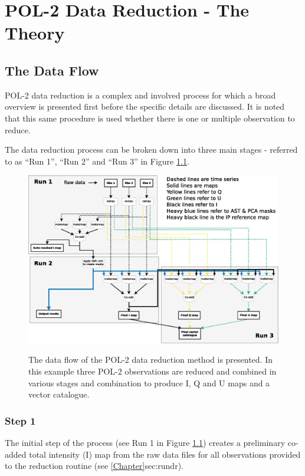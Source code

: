 \chapter{POL-2 Data Reduction - The Theory}
\label{sec:dr}
\section{The Data Flow}

POL-2 data reduction is a complex and involved process for which a broad overview is presented first before
the specific details are discussed. It is noted that this same procedure is used whether there is one or
multiple observation to reduce.

The data reduction process can be broken down into three main stages -
referred to as ``Run 1'', ``Run 2'' and ``Run 3'' in Figure \ref{fig:pol2drflow}.

\begin{figure}[t!]
\begin{center}
\includegraphics[width=0.95\linewidth]{pol2map_flow.eps}
\label{fig:pol2drflow}
\caption [POL-2 Data Flow]{
  \small The data flow of the POL-2 data reduction method is
  presented. In this example three POL-2 observations are
  reduced and combined in various stages and combination to
  produce I, Q and U maps and a vector catalogue.
}
\end{center}
\end{figure}


\subsection*{Step 1}

The initial step of the process (see Run 1 in Figure \ref{fig:pol2drflow}) creates
a preliminary co-added total intensity (I) map from the raw data files for all
observations provided to the reduction routine (see \cref{Chapter}{sec:rundr}).


